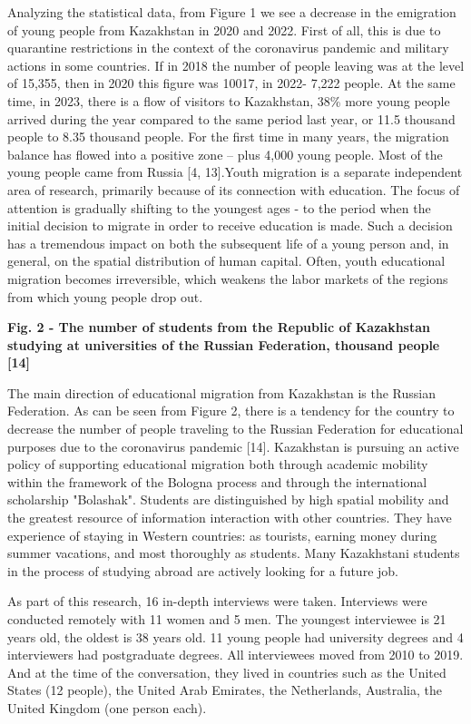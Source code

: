Analyzing the statistical data, from Figure 1 we see a decrease in the
emigration of young people from Kazakhstan in 2020 and 2022. First of
all, this is due to quarantine restrictions in the context of the
coronavirus pandemic and military actions in some countries. If in 2018
the number of people leaving was at the level of 15,355, then in 2020
this figure was 10017, in 2022- 7,222 people. At the same time, in 2023,
there is a flow of visitors to Kazakhstan, 38\% more young people
arrived during the year compared to the same period last year, or 11.5
thousand people to 8.35 thousand people. For the first time in many
years, the migration balance has flowed into a positive zone -- plus
4,000 young people. Most of the young people came from Russia {[}4,
13{]}.Youth migration is a separate independent area of research,
primarily because of its connection with education. The focus of
attention is gradually shifting to the youngest ages - to the period
when the initial decision to migrate in order to receive education is
made. Such a decision has a tremendous impact on both the subsequent
life of a young person and, in general, on the spatial distribution of
human capital. Often, youth educational migration becomes irreversible,
which weakens the labor markets of the regions from which young people
drop out.

{\bfseries Fig. 2 - The number of students from the Republic of Kazakhstan
studying at universities of the Russian Federation, thousand people
{[}14{]}}

The main direction of educational migration from Kazakhstan is the
Russian Federation. As can be seen from Figure 2, there is a tendency
for the country to decrease the number of people traveling to the
Russian Federation for educational purposes due to the coronavirus
pandemic {[}14{]}. Kazakhstan is pursuing an active policy of supporting
educational migration both through academic mobility within the
framework of the Bologna process and through the international
scholarship "Bolashak". Students are distinguished by high spatial
mobility and the greatest resource of information interaction with other
countries. They have experience of staying in Western countries: as
tourists, earning money during summer vacations, and most thoroughly as
students. Many Kazakhstani students in the process of studying abroad
are actively looking for a future job.

As part of this research, 16 in-depth interviews were taken. Interviews
were conducted remotely with 11 women and 5 men. The youngest
interviewee is 21 years old, the oldest is 38 years old. 11 young people
had university degrees and 4 interviewers had postgraduate degrees. All
interviewees moved from 2010 to 2019. And at the time of the
conversation, they lived in countries such as the United States (12
people), the United Arab Emirates, the Netherlands, Australia, the
United Kingdom (one person each).

